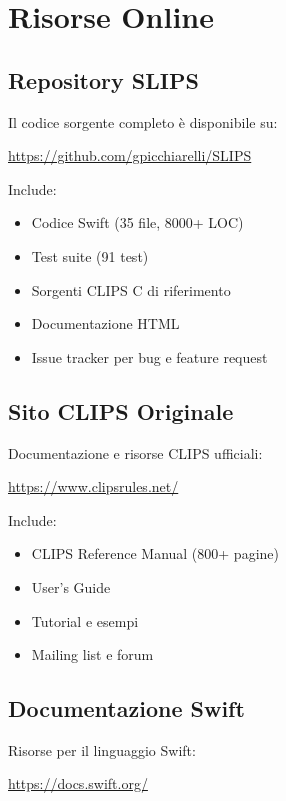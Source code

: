\section{Risorse Online}

\subsection{Repository SLIPS}

Il codice sorgente completo è disponibile su:

\begin{center}
\url{https://github.com/gpicchiarelli/SLIPS}
\end{center}

Include:
\begin{itemize}
\item Codice Swift (35 file, 8000+ LOC)
\item Test suite (91 test)
\item Sorgenti CLIPS C di riferimento
\item Documentazione HTML
\item Issue tracker per bug e feature request
\end{itemize}

\subsection{Sito CLIPS Originale}

Documentazione e risorse CLIPS ufficiali:

\begin{center}
\url{https://www.clipsrules.net/}
\end{center}

Include:
\begin{itemize}
\item CLIPS Reference Manual (800+ pagine)
\item User's Guide
\item Tutorial e esempi
\item Mailing list e forum
\end{itemize}

\subsection{Documentazione Swift}

Risorse per il linguaggio Swift:

\begin{center}
\url{https://docs.swift.org/}
\end{center}

